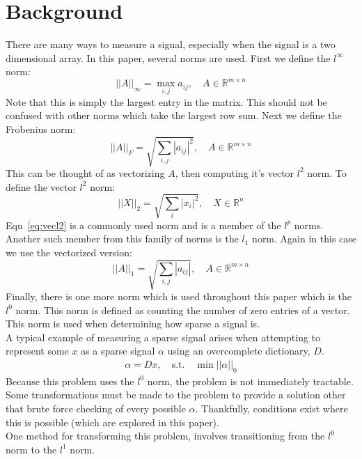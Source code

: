 \documentclass[journal]{IEEEtran}
\begin{document}
\section{Background}
There are many ways to measure a signal, especially when the signal is a two dimensional array. In this
paper, several norms are used. First we define the $l^\infty$ norm:
\begin{equation}
||A||_\infty = \max_{i,j} a_{ij}, \quad A \in \mathbb{R}^{m\times n}
\label{eq:linfty}
\end{equation}
Note that this is simply the largest entry in the matrix. This should not be confused with other 
norms which take the largest row sum. Next we define the Frobenius norm:
\begin{equation}
||A||_F = \sqrt{\sum_{i,j} |a_{ij}|^2}, \quad A \in \mathbb{R}^{m\times n}
\label{eq:frob}
\end{equation}
This can be thought of as vectorizing $A$, then computing it's vector $l^2$ norm.  To define the vector 
$l^2$ norm:
\begin{equation}
||X||_2 = \sqrt{\sum_{i} |x_{i}|^2}, \quad X \in \mathbb{R}^{n}
\label{eq:vecl2}
\end{equation}
Eqn~\ref{eq:vecl2} is a commonly used norm and is a member of the $l^p$ norms. Another such member from
this family of norms is the $l_1$ norm. Again in this case we use the vectorized version:
\begin{equation}
||A||_1 = \sqrt{\sum_{i,j} |a_{ij}|}, \quad A \in \mathbb{R}^{m\times n}
\label{eq:l1}
\end{equation}
Finally, there is one more norm which is used throughout this paper which is the $l^0$ norm. This 
norm is defined as counting the number of zero entries of a vector. This norm is used when determining
how sparse a signal is. \\
A typical example of measuring a sparse signal arises when attempting to represent some $x$ 
as a sparse signal $\alpha$ using an overcomplete dictionary, $D$.
\begin{align}
\alpha = Dx, \quad \mathrm{s.t.} \quad \min ||\alpha||_0
\label{eq:sparseproblem}
\end{align}
Because this problem uses the $l^0$ norm, the problem is not immediately tractable. Some transformations
must be made to the problem to provide a solution other that brute force checking of every possible
$\alpha$. Thankfully, conditions exist where this is possible (which are explored in this paper). \\
One method for transforming this problem, involves transitioning from the $l^0$ norm to the $l^1$ norm.
\end{document}
